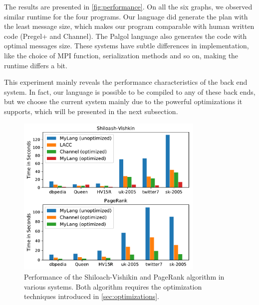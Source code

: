 \documentclass{sokendai_thesis} %
\begin{document}
The results are presented in \autoref{fig:performance}.
On all the six graphs, we observed similar runtime for the four programs.
Our language did generate the plan with the least message size, which makes our program comparable with human written code (Pregel+ and Channel).
The Palgol language also generates the code with optimal messages size.
These systems have subtle differences in implementation, like the choice of MPI function, serialization methods and so on, making the runtime differs a bit.

This experiment mainly reveals the performance characteristics of the back end system.
In fact, our language is possible to be compiled to any of these back ends, but we choose the current system mainly due to the powerful optimizations it supports, which will be presented in the next subsection.

\begin{figure}
\centering
\includegraphics[width=0.8\textwidth]{figures/both.pdf}
\caption{Performance of the Shiloach-Vishikin and PageRank algorithm in various systems. Both algorithm requires the optimization techniques introduced in \autoref{sec:optimizations}. }
\label{fig:sv-results}
\end{figure}
\end{document}
